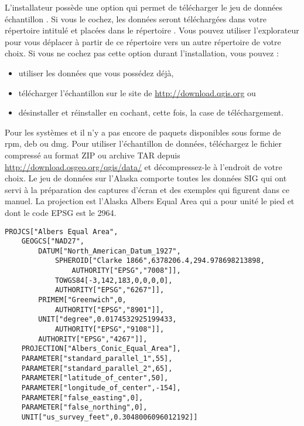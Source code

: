 \win L'installateur \mswin possède une option qui permet de télécharger le jeu de données échantillon \qg.
Si vous le cochez, les données seront téléchargées dans votre répertoire intitulé  et placées dans le répertoire . Vous pouvez utiliser l'explorateur \mswin pour vous déplacer à partir de ce répertoire vers un autre répertoire de votre choix.
Si vous ne cochez pas cette option durant l'installation, vous pouvez :
\begin{itemize}[label=--]
\item utiliser les données que vous possédez déjà,
\item télécharger l'échantillon sur le site de \qg
 \url{http://download.qgis.org} ou
\item désinstaller et réinstaller \qg en cochant, cette fois, la case de téléchargement.
\end{itemize}

\bigskip

\nix \osx Pour les systèmes \tux et \mac il n'y a pas encore de paquets disponibles sous forme de rpm, deb ou dmg. Pour utiliser 
l'échantillon de données, téléchargez le fichier compressé  au format ZIP ou archive TAR depuis 
\url{http://download.osgeo.org/qgis/data/}
et décompressez-le à l'endroit de votre choix. Le jeu de données sur l'Alaska comporte toutes les données SIG qui ont servi à la préparation des captures d'écran et des exemples qui figurent dans ce manuel. La projection est l'Alaska Albers Equal Area qui a pour unité le pied et dont le code EPSG est le 2964.

\begin{verbatim}
PROJCS["Albers Equal Area",
    GEOGCS["NAD27",
        DATUM["North_American_Datum_1927",
            SPHEROID["Clarke 1866",6378206.4,294.978698213898,
                AUTHORITY["EPSG","7008"]],
            TOWGS84[-3,142,183,0,0,0,0],
            AUTHORITY["EPSG","6267"]],
        PRIMEM["Greenwich",0,
            AUTHORITY["EPSG","8901"]],
        UNIT["degree",0.0174532925199433,
            AUTHORITY["EPSG","9108"]],
        AUTHORITY["EPSG","4267"]],
    PROJECTION["Albers_Conic_Equal_Area"],
    PARAMETER["standard_parallel_1",55],
    PARAMETER["standard_parallel_2",65],
    PARAMETER["latitude_of_center",50],
    PARAMETER["longitude_of_center",-154],
    PARAMETER["false_easting",0],
    PARAMETER["false_northing",0],
    UNIT["us_survey_feet",0.3048006096012192]]
\end{verbatim}

